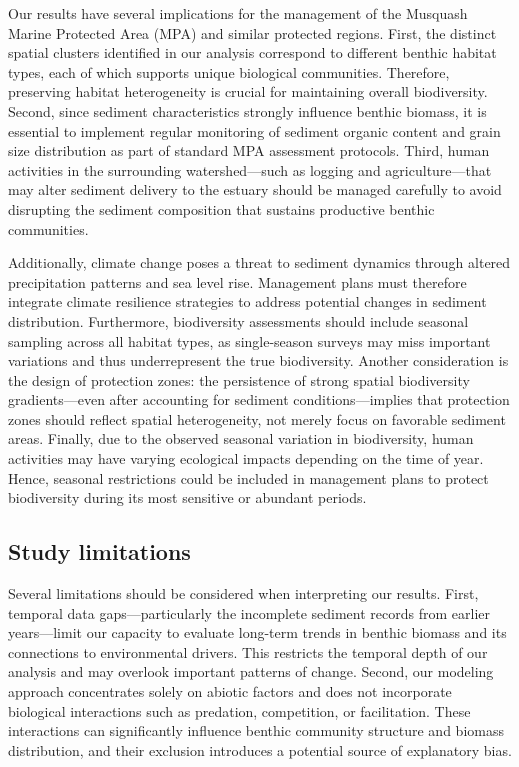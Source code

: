 \documentclass[12pt]{article}
\begin{document}
{\qquad Our results have several implications for the management of the Musquash
Marine Protected Area (MPA) and similar protected regions. First, the distinct
spatial clusters identified in our analysis correspond to different benthic
habitat types, each of which supports unique biological communities. Therefore,
preserving habitat heterogeneity is crucial for maintaining overall
biodiversity. Second, since sediment characteristics strongly influence benthic
biomass, it is essential to implement regular monitoring of sediment organic
content and grain size distribution as part of standard MPA assessment
protocols. Third, human activities in the surrounding watershed—such as logging
and agriculture—that may alter sediment delivery to the estuary should be
managed carefully to avoid disrupting the sediment composition that sustains
productive benthic communities.

\qquad Additionally, climate change poses a threat to sediment dynamics through
altered precipitation patterns and sea level rise. Management plans must
therefore integrate climate resilience strategies to address potential changes
in sediment distribution. Furthermore, biodiversity assessments should include
seasonal sampling across all habitat types, as single-season surveys may miss
important variations and thus underrepresent the true biodiversity. Another
consideration is the design of protection zones: the persistence of strong
spatial biodiversity gradients—even after accounting for sediment
conditions—implies that protection zones should reflect spatial heterogeneity,
not merely focus on favorable sediment areas. Finally, due to the observed
seasonal variation in biodiversity, human activities may have varying ecological
impacts depending on the time of year. Hence, seasonal restrictions could be
included in management plans to protect biodiversity during its most sensitive
or abundant periods.

\subsection{Study limitations}

\qquad Several limitations should be considered when interpreting our results.
First, temporal data gaps—particularly the incomplete sediment records from
earlier years—limit our capacity to evaluate long-term trends in benthic biomass
and its connections to environmental drivers. This restricts the temporal depth
of our analysis and may overlook important patterns of change. Second, our
modeling approach concentrates solely on abiotic factors and does not
incorporate biological interactions such as predation, competition, or
facilitation. These interactions can significantly influence benthic community
structure and biomass distribution, and their exclusion introduces a potential
source of explanatory bias.

}
\end{document}
